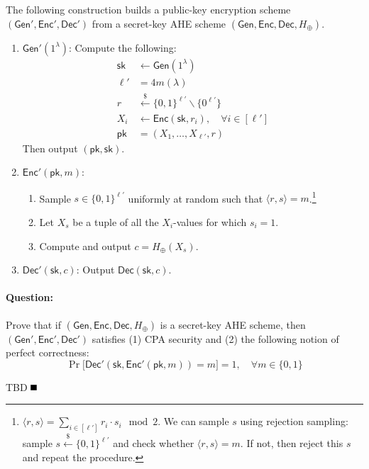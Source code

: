 \documentclass[11pt]{article}
\newenvironment{solution}{\color{blue}\noindent{\bf Solution}\hspace*{1em}}{\qed\medskip}
\newcommand{\qed}{\mbox{}\hspace*{\fill}\nolinebreak\mbox{$\rule{0.6em}{0.6em}$}} %
\numberwithin{equation}{section}
\newcommand{\Gen}{\mathsf{Gen}}
\newcommand{\Enc}{\mathsf{Enc}}
\newcommand{\Dec}{\mathsf{Dec}}
\newcommand{\pk}{\mathsf{pk}}
\newcommand{\sk}{\mathsf{sk}}
\newcommand{\secp}{\lambda}
\newcommand{\getsr}{\stackrel{\$}{\gets}}
\newcommand{\bin}{\{0,1\}}
\newcommand{\bit}{\bin}
\begin{document}
The following construction builds a public-key encryption scheme $(\Gen', \Enc', \Dec')$ from a secret-key AHE scheme $(\Gen, \Enc, \Dec, H_\oplus)$.
\begin{enumerate}
    \item $\Gen'(1^\secp)$: Compute the following:
    \begin{align*}
        \sk &\leftarrow \Gen(1^\secp)\\
        \ell' &= 4 m(\secp)\\
        r &\getsr \bit^{\ell'} \backslash \{0^{\ell'}\}\\
        X_i &\gets \Enc(\sk, r_i), \quad \forall i \in [{\ell'}]\\
        \pk &= (X_1, \dots, X_{\ell'}, r)
    \end{align*}
    Then output $(\pk, \sk)$.

    \item $\Enc'(\pk, m)$: 
    \begin{enumerate}
        \item Sample $s \in \bit^{\ell'}$ uniformly at random such that $\langle r, s \rangle = m$.\footnote{$\langle r, s \rangle = \sum_{i \in [{\ell'}]} r_i \cdot s_i \mod 2$. We can sample $s$ using rejection sampling: sample $s \getsr \bit^{\ell'}$ and check whether $\langle r, s \rangle = m$. If not, then reject this $s$ and repeat the procedure.}
        \item Let $X_s$ be a tuple of all the $X_i$-values for which $s_i = 1$.
        \item Compute and output $c = H_\oplus(X_s)$.
    \end{enumerate}
    \item $\Dec'(\sk, c)$: Output $\Dec(\sk, c)$.
\end{enumerate}

\paragraph{Question:} Prove that if $(\Gen, \Enc, \Dec, H_\oplus)$ is a secret-key AHE scheme, then $(\Gen', \Enc', \Dec')$ satisfies (1) CPA security and (2) the following notion of perfect correctness:
\[\Pr\big[\Dec'(\sk, \Enc'(\pk, m)) = m\big] = 1, \quad \forall m \in \bit\]

\vspace{5mm}
\begin{solution}
TBD
\end{solution}
\end{document}
